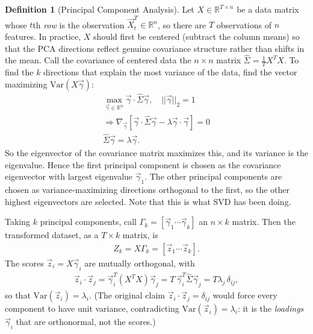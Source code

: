 \documentclass[11pt]{article}
\theoremstyle{definition}
\newtheorem{definition}{Definition}[section]
\theoremstyle{plain}
\theoremstyle{remark}
\begin{document}
\begin{definition}[Principal Component Analysis]
    Let $X \in \mathbb{R}^{T \times n}$ be a data matrix whose $t$th \emph{row} is the observation $\vec{X}_t^T \in \mathbb{R}^n$, so there are $T$ observations of $n$ features. In practice, $X$ should first be centered (subtract the column means) so that the PCA directions reflect genuine covariance structure rather than shifts in the mean. Call the covariance of centered data the $n\times n$ matrix $\hat{\Sigma} = \frac{1}{T} X^TX$. To find the $k$ directions that explain the most variance of the data, find the vector maximizing $\text{Var}(X\vec{\gamma})$:
    \begin{align}
        \max_{\vec{\gamma}\in \mathbb{R}^n} \vec{\gamma} \cdot \hat{\Sigma}\vec{\gamma}, \quad ||\vec{\gamma}||_2=1\\
        \Rightarrow \nabla_{\vec{\gamma}}[\vec{\gamma} \cdot \hat{\Sigma}\vec{\gamma}-\lambda\vec{\gamma} \cdot \vec{\gamma}]=0\\
        \hat{\Sigma}\vec{\gamma} = \lambda \vec{\gamma}.
    \end{align}
    So the eigenvector of the covariance matrix maximizes this, and its variance is the eigenvalue. Hence the first principal component is chosen as the covariance eigenvector with largest eigenvalue $\vec{\gamma}_1$. The other principal components are chosen as variance-maximizing directions orthogonal to the first, so the other highest eigenvectors are selected. Note that this is what SVD has been doing.

    Taking $k$ principal components, call $\Gamma_k = \left[\vec{\gamma}_1\cdots\vec{\gamma}_k\right]$ an $n \times k$ matrix. Then the transformed dataset, as a $T \times k$ matrix, is
    \begin{align}
        Z_k = X\Gamma_k = \left[\vec{z}_1\cdots\vec{z}_k\right].
    \end{align}
    The scores $\vec{z}_i = X\vec{\gamma}_i$ are mutually orthogonal, with
    \begin{align}
        \vec{z}_i \cdot \vec{z}_j = \vec{\gamma}_i^T (X^TX) \vec{\gamma}_j = T\,\vec{\gamma}_i^T \hat{\Sigma}\vec{\gamma}_j = T\lambda_j\,\delta_{ij},
    \end{align}
    so that $\text{Var}(\vec{z}_i) = \lambda_i$. (The original claim $\vec{z}_i\cdot\vec{z}_j = \delta_{ij}$ would force every component to have unit variance, contradicting $\text{Var}(\vec{z}_i)=\lambda_i$: it is the \emph{loadings} $\vec{\gamma}_i$ that are orthonormal, not the scores.)
\end{definition}
\end{document}
